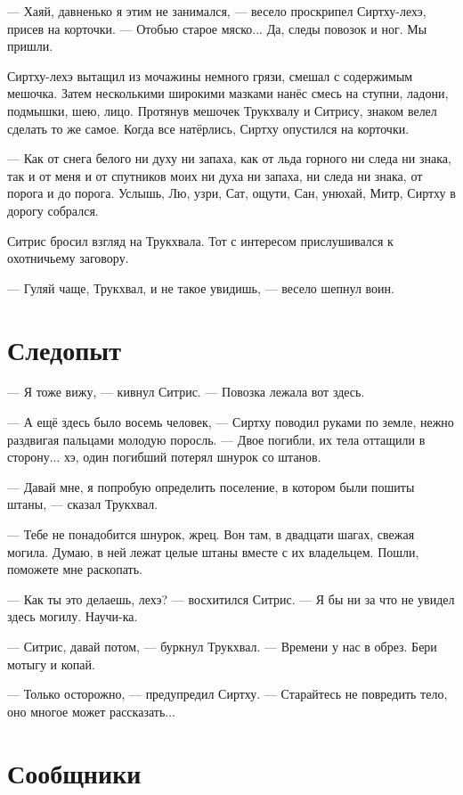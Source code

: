 --- Хаяй, давненько я этим не занимался, --- весело проскрипел Сиртху-лехэ, присев на корточки.
--- Отобью старое мяско...
Да, следы повозок и ног.
Мы пришли.

Сиртху-лехэ вытащил из мочажины немного грязи, смешал с содержимым мешочка.
Затем несколькими широкими мазками нанёс смесь на ступни, ладони, подмышки, шею, лицо.
Протянув мешочек Трукхвалу и Ситрису, знаком велел сделать то же самое.
Когда все натёрлись, Сиртху опустился на корточки.

--- Как от снега белого ни духу ни запаха, как от льда горного ни следа ни знака, так и от меня и от спутников моих ни духа ни запаха, ни следа ни знака, от порога и до порога.
Услышь, Лю, узри, Сат, ощути, Сан, унюхай, Митр, Сиртху в дорогу собрался.

Ситрис бросил взгляд на Трукхвала.
Тот с интересом прислушивался к охотничьему заговору.

--- Гуляй чаще, Трукхвал, и не такое увидишь, --- весело шепнул воин.

\section{Следопыт}

--- Я тоже вижу, --- кивнул Ситрис.
--- Повозка лежала вот здесь.

--- А ещё здесь было восемь человек, --- Сиртху поводил руками по земле, нежно раздвигая пальцами молодую поросль.
--- Двое погибли, их тела оттащили в сторону... хэ, один погибший потерял шнурок со штанов.

--- Давай мне, я попробую определить поселение, в котором были пошиты штаны, --- сказал Трукхвал.

--- Тебе не понадобится шнурок, жрец.
Вон там, в двадцати шагах, свежая могила.
Думаю, в ней лежат целые штаны вместе с их владельцем.
Пошли, поможете мне раскопать.

--- Как ты это делаешь, лехэ? --- восхитился Ситрис.
--- Я бы ни за что не увидел здесь могилу.
Научи-ка.

--- Ситрис, давай потом, --- буркнул Трукхвал.
--- Времени у нас в обрез.
Бери мотыгу и копай.

--- Только осторожно, --- предупредил Сиртху.
--- Старайтесь не повредить тело, оно многое может рассказать...

\section{Сообщники}

